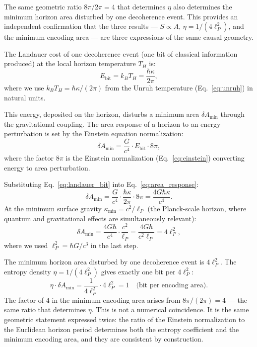 \documentclass[12pt,a4paper]{article}
\begin{document}
The same geometric ratio $8\pi/2\pi = 4$ that determines $\eta$
also determines the minimum horizon area disturbed by one
decoherence event. This provides an independent confirmation that
the three results --- $S \propto A$, $\eta = 1/(4\ell_P^2)$, and
the minimum encoding area --- are three expressions of the same
causal geometry.

The Landauer cost of one decoherence event (one bit of classical
information produced) at the local horizon temperature $T_H$ is:
\begin{equation}
E_\mathrm{bit} = k_B T_H = \frac{\hbar\kappa}{2\pi},
\label{eq:landauer_bit}
\end{equation}
where we use $k_B T_H = \hbar\kappa/(2\pi)$ from the Unruh
temperature (Eq.~\ref{eq:unruh}) in natural units.

This energy, deposited on the horizon, disturbs a minimum area
$\delta A_\mathrm{min}$ through the gravitational coupling. The
area response of a horizon to an energy perturbation is set by
the Einstein equation normalization:
\begin{equation}
\delta A_\mathrm{min} = \frac{G}{c^4} \cdot E_\mathrm{bit}
\cdot 8\pi,
\label{eq:area_response}
\end{equation}
where the factor $8\pi$ is the Einstein normalization
(Eq.~\ref{eq:einstein}) converting energy to area perturbation.

Substituting Eq.~\eqref{eq:landauer_bit} into
Eq.~\eqref{eq:area_response}:
\begin{equation}
\delta A_\mathrm{min}
= \frac{G}{c^4} \cdot \frac{\hbar\kappa}{2\pi} \cdot 8\pi
= \frac{4G\hbar\kappa}{c^4}.
\label{eq:dA_step}
\end{equation}
At the minimum surface gravity $\kappa_\mathrm{min} = c^2/\ell_P$
(the Planck-scale horizon, where quantum and gravitational effects
are simultaneously relevant):
\begin{equation}
\delta A_\mathrm{min}
= \frac{4G\hbar}{c^4} \cdot \frac{c^2}{\ell_P}
= \frac{4G\hbar}{c^2\ell_P}
= 4\ell_P^2,
\label{eq:dA_min}
\end{equation}
where we used $\ell_P^2 = \hbar G/c^3$ in the last step.

The minimum horizon area disturbed by one decoherence event is
$4\ell_P^2$. The entropy density $\eta = 1/(4\ell_P^2)$ gives
exactly one bit per $4\ell_P^2$:
\begin{equation}
\eta \cdot \delta A_\mathrm{min}
= \frac{1}{4\ell_P^2} \cdot 4\ell_P^2 = 1
\quad \text{(bit per encoding area).}
\label{eq:one_bit}
\end{equation}
The factor of 4 in the minimum encoding area arises from
$8\pi/(2\pi) = 4$ --- the same ratio that determines $\eta$.
This is not a numerical coincidence. It is the same geometric
statement expressed twice: the ratio of the Einstein normalization
to the Euclidean horizon period determines both the entropy
coefficient and the minimum encoding area, and they are
consistent by construction.
\end{document}

